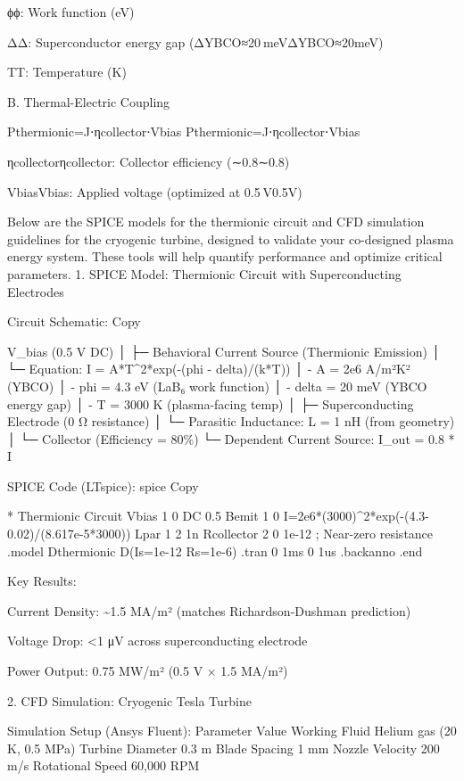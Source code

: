 \documentclass{article}
\begin{document}
ϕϕ: Work function (eV)

ΔΔ: Superconductor energy gap (ΔYBCO≈20 meVΔYBCO\hspace{0pt}≈20meV)

TT: Temperature (K)

B. Thermal-Electric Coupling

Pthermionic=J⋅ηcollector⋅Vbias
Pthermionic\hspace{0pt}=J⋅ηcollector\hspace{0pt}⋅Vbias\hspace{0pt}

ηcollectorηcollector\hspace{0pt}: Collector efficiency (∼0.8∼0.8)

VbiasVbias\hspace{0pt}: Applied voltage (optimized at 0.5 V0.5V)

Below are the SPICE models for the thermionic circuit and CFD simulation
guidelines for the cryogenic turbine, designed to validate your
co-designed plasma energy system. These tools will help quantify
performance and optimize critical parameters. 1. SPICE Model: Thermionic
Circuit with Superconducting Electrodes

Circuit Schematic: Copy

V\_bias (0.5 V DC) │ ├─ Behavioral Current Source (Thermionic Emission)
│ └─ Equation: I = A*T\^{}2*exp(-(phi - delta)/(k*T)) │ - A = 2e6 A/m²K²
(YBCO) │ - phi = 4.3 eV (LaB₆ work function) │ - delta = 20 meV (YBCO
energy gap) │ - T = 3000 K (plasma-facing temp) │ ├─ Superconducting
Electrode (0 Ω resistance) │ └─ Parasitic Inductance: L = 1 nH (from
geometry) │ └─ Collector (Efficiency = 80\%) └─ Dependent Current
Source: I\_out = 0.8 * I

SPICE Code (LTspice): spice Copy

* Thermionic Circuit Vbias 1 0 DC 0.5 Bemit 1 0
I=2e6*(3000)\^{}2*exp(-(4.3-0.02)/(8.617e-5*3000)) Lpar 1 2 1n
Rcollector 2 0 1e-12 ; Near-zero resistance .model Dthermionic
D(Is=1e-12 Rs=1e-6) .tran 0 1ms 0 1us .backanno .end

Key Results:

Current Density: \textasciitilde1.5 MA/m² (matches Richardson-Dushman
prediction)

Voltage Drop: \textless1 μV across superconducting electrode

Power Output: 0.75 MW/m² (0.5 V × 1.5 MA/m²)

2. CFD Simulation: Cryogenic Tesla Turbine

Simulation Setup (Ansys Fluent): Parameter Value Working Fluid Helium
gas (20 K, 0.5 MPa) Turbine Diameter 0.3 m Blade Spacing 1 mm Nozzle
Velocity 200 m/s Rotational Speed 60,000 RPM
\end{document}
